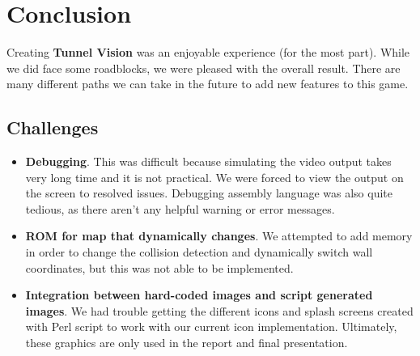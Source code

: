\documentclass[11pt]{article}
\begin{document}

		
		

		
	


\section{Conclusion}
Creating \textbf{Tunnel Vision} was an enjoyable experience (for the most part).  While we did face some roadblocks, we were pleased with the overall result.  There are many different paths we can take in the future to add new features to this game.

	\subsection{Challenges}
		
		\begin{itemize}				
		
		\item \textbf{Debugging}. This was difficult because simulating the video output takes very long time and it is not practical. We were forced to view the output on the screen to resolved issues.  Debugging assembly language was also quite tedious, as there aren't any helpful warning or error messages.  
	
		\item \textbf{ROM for map that dynamically changes}. We attempted to add memory in order to change the collision detection and dynamically switch wall coordinates, but this was not able to be implemented.
		
		\item \textbf{Integration between hard-coded images and script generated images}.  We had trouble getting the different icons and splash screens created with Perl script to work with our current icon implementation.  Ultimately, these graphics are only used in the report and final presentation.
				
		\end{itemize}
\end{document}
